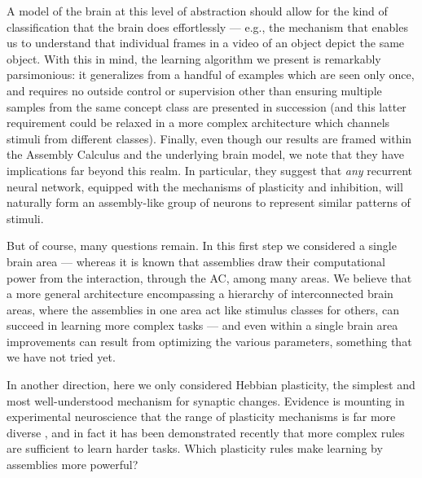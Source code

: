 \documentclass[final,12pt]{colt2022} %
\begin{document}
A model of the brain at this level of abstraction should allow for the kind of classification that the brain does effortlessly --- e.g., the mechanism that enables us to understand that individual frames in a video of an object depict the same object. With this in mind, the learning algorithm we present is remarkably parsimonious: it generalizes from a handful of examples which are seen only once, and requires no outside control or supervision other than ensuring multiple samples from the same concept class are presented in succession (and this latter requirement could be relaxed in a more complex architecture which channels stimuli from different classes).  Finally, even though our results are framed within the Assembly Calculus and the underlying brain model, we note that they have implications far beyond this realm. In particular, they suggest that \emph{any} recurrent neural network, equipped with the mechanisms of plasticity and inhibition, will naturally form an assembly-like group of neurons to represent similar patterns of stimuli.

But of course, many questions remain.  In this first step we considered a single brain area --- whereas it is known that assemblies draw their computational power from the interaction, through the AC, among many areas.  
We believe that a more general architecture encompassing a hierarchy of interconnected brain areas, where the assemblies in one area act like stimulus classes for others, can succeed in learning more complex tasks --- and even within a single brain area improvements can result from optimizing the various parameters, something that we have not tried yet.   

In another direction, here we only considered Hebbian plasticity, the simplest and most well-understood mechanism for synaptic changes. Evidence is mounting in experimental neuroscience that the range of plasticity mechanisms is far more diverse \citep{magee2020synaptic}, and in fact it has been demonstrated recently \citep{payeur2021burst} that more complex rules are sufficient to learn harder tasks. Which plasticity rules make learning by assemblies more powerful?
\end{document}
